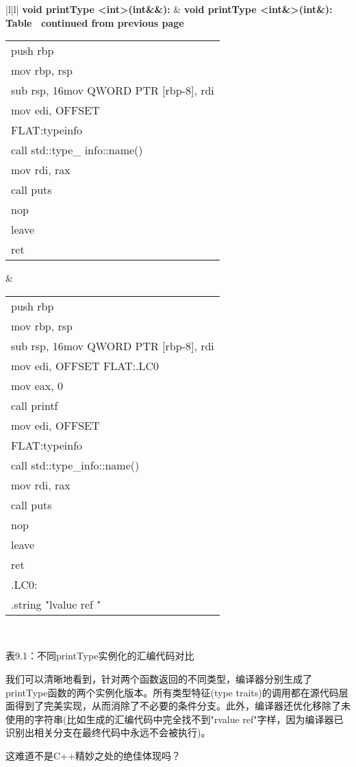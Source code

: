 \begin{longtable}{|l|l|}
\hline
\textbf{void printType \textless{}int\textgreater{}(int\&\&):} &
  \textbf{void printType \textless{}int\&\textgreater{}(int\&):} \\ \hline
\endfirsthead
%
%
{{\bfseries Table \thetable\ continued from previous page}} \\
\endhead
%
\begin{tabular}[c]{@{}l@{}}push rbp\\ mov rbp, rsp\\ sub rsp, 16mov QWORD PTR {[}rbp-8{]}, rdi\\ mov edi, OFFSET \\                   FLAT:typeinfo \\ call std::type\_ info::name() \\ mov rdi, rax\\ call puts \\ nop \\ leave \\ ret\end{tabular} &
  \begin{tabular}[c]{@{}l@{}}push rbp\\ mov rbp, rsp\\ sub rsp, 16mov QWORD PTR {[}rbp-8{]}, rdi\\ mov edi, OFFSET FLAT:.LC0 \\ mov eax, 0 \\ call printf \\ mov edi, OFFSET \\                  FLAT:typeinfo \\ call std::type\_info::name() \\ mov rdi, rax\\ call puts \\ nop \\ leave \\ ret \\   .LC0:\\     .string "lvalue ref "\end{tabular} \\ \hline
\end{longtable}

\begin{center}
表9.1：不同printType实例化的汇编代码对比
\end{center}

我们可以清晰地看到，针对两个函数返回的不同类型，编译器分别生成了printType函数的两个实例化版本。所有类型特征(type traits)的调用都在源代码层面得到了完美实现，从而消除了不必要的条件分支。此外，编译器还优化移除了未使用的字符串(比如生成的汇编代码中完全找不到"rvalue ref"字样，因为编译器已识别出相关分支在最终代码中永远不会被执行)。

这难道不是C++精妙之处的绝佳体现吗？





















